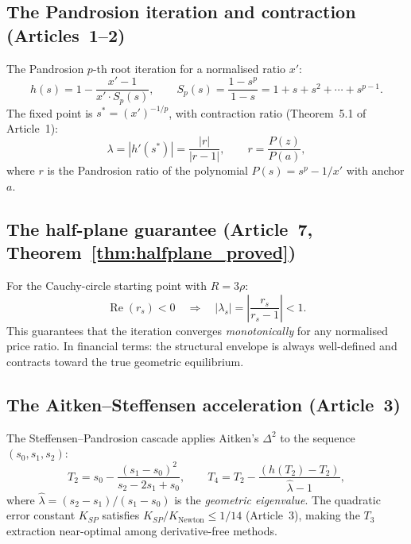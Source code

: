 \documentclass[10pt,a4paper,oneside]{book}
\theoremstyle{definition}
\theoremstyle{remark}
\begin{document}
\subsection{The Pandrosion iteration and contraction (Articles~1--2)}

The Pandrosion $p$-th root iteration for a normalised ratio $x'$:
\begin{equation}
  \label{eq:t4_iter}
  h(s) = 1 - \frac{x' - 1}{x' \cdot S_p(s)},
  \qquad S_p(s) = \frac{1 - s^p}{1 - s} = 1 + s + s^2 + \cdots + s^{p-1}.
\end{equation}
The fixed point is $s^* = (x')^{-1/p}$, with contraction ratio (Theorem~5.1 of Article~1):
\begin{equation}
  \label{eq:t4_lambda}
  \lambda = |h'(s^*)| = \frac{|r|}{|r-1|}, \qquad r = \frac{P(z)}{P(a)},
\end{equation}
where $r$ is the Pandrosion ratio of the polynomial $P(s) = s^p - 1/x'$ with anchor $a$.

\subsection{The half-plane guarantee (Article~7, Theorem~\ref{thm:halfplane_proved})}

For the Cauchy-circle starting point with $R = 3\rho$:
\[
  \operatorname{Re}(r_s) < 0 \quad \Longrightarrow \quad |\lambda_s| = \left|\frac{r_s}{r_s - 1}\right| < 1.
\]
This guarantees that the iteration converges \emph{monotonically} for any normalised price ratio.  In financial terms: the structural envelope is always well-defined and contracts toward the true geometric equilibrium.

\subsection{The Aitken--Steffensen acceleration (Article~3)}

The Steffensen--Pandrosion cascade applies Aitken's $\Delta^2$ to the sequence $(s_0, s_1, s_2)$:
\begin{equation}
  T_2 = s_0 - \frac{(s_1 - s_0)^2}{s_2 - 2s_1 + s_0}, \qquad
  T_4 = T_2 - \frac{(h(T_2) - T_2)}{\hat{\lambda} - 1},
\end{equation}
where $\hat{\lambda} = (s_2 - s_1)/(s_1 - s_0)$ is the \emph{geometric eigenvalue}.  The quadratic error constant $K_{SP}$ satisfies $K_{SP}/K_{\text{Newton}} \leq 1/14$ (Article~3), making the $T_3$ extraction near-optimal among derivative-free methods.
\end{document}
